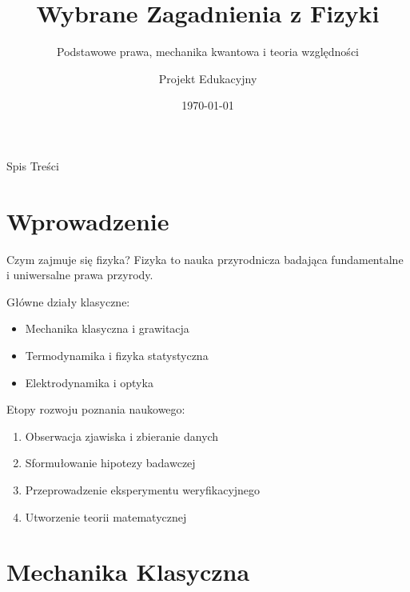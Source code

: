 \documentclass[aspectratio=169]{beamer}
\title[Fizyka Współczesna i Klasyczna]{Wybrane Zagadnienia z Fizyki}
\subtitle{Podstawowe prawa, mechanika kwantowa i teoria względności}
\author{Projekt Edukacyjny}
\date{\today}
\begin{document}
\begin{frame}
    \titlepage
\end{frame}

\begin{frame}{Spis Treści}
    \tableofcontents
\end{frame}

\section{Wprowadzenie}

\begin{frame}{Czym zajmuje się fizyka?}
    Fizyka to nauka przyrodnicza badająca fundamentalne i uniwersalne prawa przyrody.
    
    \vspace{0.3cm}
    Główne działy klasyczne:
    \begin{itemize}
        \item Mechanika klasyczna i grawitacja
        \item Termodynamika i fizyka statystyczna
        \item Elektrodynamika i optyka
    \end{itemize}
    
    \vspace{0.3cm}
    Etopy rozwoju poznania naukowego:
    \begin{enumerate}
        \item Obserwacja zjawiska i zbieranie danych
        \item Sformułowanie hipotezy badawczej
        \item Przeprowadzenie eksperymentu weryfikacyjnego
        \item Utworzenie teorii matematycznej
    \end{enumerate}
\end{frame}

\section{Mechanika Klasyczna}
\end{document}
